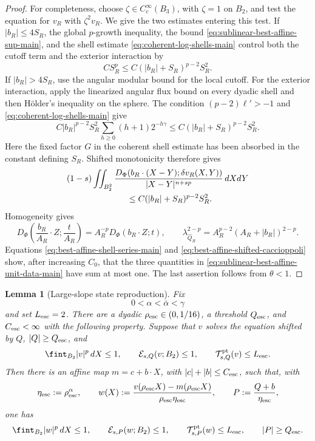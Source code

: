 \documentclass[11pt,reqno]{amsart}
\numberwithin{equation}{section}
\newcommand{\dd}{\,d}
\newtheorem{lemma}[theorem]{Lemma}
\theoremstyle{remark}
\begin{document}
\begin{proof}
For completeness, choose \(\zeta\in C_c^\infty(B_3)\), with
\(\zeta=1\) on \(B_2\), and test the equation for \(v_R\) with
\(\zeta^2v_R\).  We give the two estimates entering this test.  If
\(|b_R|\le4S_R\), the global \(p\)-growth inequality, the bound
\eqref{eq:sublinear-best-affine-sup-main}, and the shell estimate
\eqref{eq:coherent-log-shells-main} control both the cutoff term and
the exterior interaction by
\[
 CS_R^p\le C(|b_R|+S_R)^{p-2}S_R^2.
\]
If \(|b_R|>4S_R\), use the angular modular bound for the local cutoff.
For the exterior interaction, apply the linearized angular flux bound
on every dyadic shell and then H\"older's inequality on the sphere.
The condition \((p-2)\ell'>-1\) and
\eqref{eq:coherent-log-shells-main} give
\[
 C|b_R|^{p-2}S_R^2
 \sum_{h\ge0}(h+1)2^{-h\gamma}
 \le C(|b_R|+S_R)^{p-2}S_R^2.
\]
Here the fixed factor \(G\) in the coherent shell estimate has been
absorbed in the constant defining \(S_R\).  Shifted monotonicity
therefore gives
\begin{equation}
 \begin{split}
 &(1-s)\iint_{B_2^2}
 \frac{D_\Phi(b_R\cdot(X-Y);\delta v_R(X,Y))}
 {|X-Y|^{n+sp}}\dd X\!\dd Y\\
 &\hspace{25mm}\le
 C(|b_R|+S_R)^{p-2}S_R^2.
 \end{split}
 \label{eq:best-affine-shifted-caccioppoli}
\end{equation}
Homogeneity gives
\[
 D_\Phi\left(\frac{b_R}{A_R}\cdot Z;
             \frac{t}{A_R}\right)
 =A_R^{-p}D_\Phi(b_R\cdot Z;t),
\qquad
 \lambda_{\widehat Q_R}^{2-p}
 =A_R^{p-2}(A_R+|b_R|)^{2-p}.
\]
Equations \eqref{eq:best-affine-shell-series-main} and
\eqref{eq:best-affine-shifted-caccioppoli} show, after increasing
\(C_0\), that the three quantities in
\eqref{eq:sublinear-best-affine-unit-data-main} have sum at most one.
The last assertion follows from
\(\theta<1\).
\end{proof}

\begin{lemma}[Large-slope state reproduction]
\label{lem:large-slope-escape-state-main}
Fix
\[
 0<\alpha<\bar\alpha<\gamma
\]
and set \(L_{\rm esc}=2\).  There are a dyadic
\(\rho_{\rm esc}\in(0,1/16)\), a threshold \(Q_{\rm esc}\), and
\(C_{\rm esc}<\infty\) with the following property.  Suppose that \(v\)
solves the equation shifted by \(Q\), \(|Q|\ge Q_{\rm esc}\), and
\[
 \fint_{B_2}|v|^p\dd X\le1,\qquad
 \mathcal E_{s,Q}(v;B_2)\le1,\qquad
 \mathcal T^{\rm pt}_{s,Q}(v)\le L_{\rm esc}.
\]
Then there is an affine map \(m=c+b\cdot X\), with
\(|c|+|b|\le C_{\rm esc}\), such that, with
\[
 \eta_{\rm esc}:=\rho_{\rm esc}^{\alpha},\qquad
 w(X):=\frac{v(\rho_{\rm esc}X)-m(\rho_{\rm esc}X)}
 {\rho_{\rm esc}\eta_{\rm esc}},\qquad
 P:=\frac{Q+b}{\eta_{\rm esc}},
\]
one has
\begin{equation}
 \fint_{B_2}|w|^p\dd X\le1,\qquad
 \mathcal E_{s,P}(w;B_2)\le1,\qquad
 \mathcal T^{\rm pt}_{s,P}(w)\le L_{\rm esc},\qquad
 |P|\ge Q_{\rm esc}.
 \label{eq:large-slope-escape-state-reproduction}
\end{equation}
\end{lemma}
\end{document}
